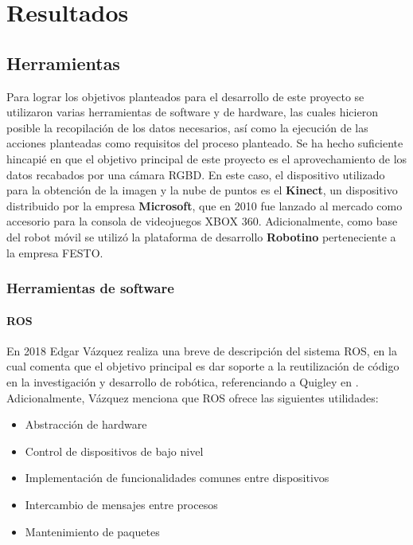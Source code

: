 \chapter{Resultados}
    \section{Herramientas}
    Para lograr los objetivos planteados para el desarrollo de este proyecto se utilizaron varias herramientas de software y de hardware, las cuales hicieron posible la recopilación de los datos necesarios, así como la ejecución de las acciones planteadas como requisitos del proceso planteado.
    Se ha hecho suficiente hincapié en que el objetivo principal de este proyecto es el aprovechamiento de los datos recabados por una cámara RGBD. En este caso, el dispositivo utilizado para la obtención de la imagen y la nube de puntos es el \textbf{Kinect}, un dispositivo distribuido por la empresa \textbf{Microsoft}, que en 2010 fue lanzado al mercado como accesorio para la consola de videojuegos XBOX 360. Adicionalmente, como base del robot móvil se utilizó la plataforma de desarrollo \textbf{Robotino} perteneciente a la empresa FESTO.

    
        \subsection{Herramientas de software}
            \subsubsection{ROS}
            En 2018 Edgar Vázquez realiza una breve de descripción del sistema ROS, en la cual comenta que el objetivo principal es dar soporte a la reutilización de código en la investigación y desarrollo de robótica, referenciando a Quigley en \cite{quigley_ROS}. Adicionalmente, Vázquez menciona que ROS ofrece las siguientes utilidades:
            \begin{itemize}
                \item Abstracción de hardware
                \item Control de dispositivos de bajo nivel
                \item Implementación de funcionalidades comunes entre dispositivos
                \item Intercambio de mensajes entre procesos
                \item Mantenimiento de paquetes
            \end{itemize}

